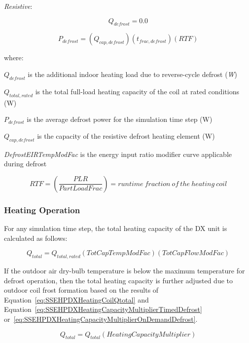 \emph{Resistive}:

\begin{equation}
{Q_{defrost}} = 0.0
\end{equation}

\begin{equation}
{P_{defrost}} = \left( {{Q_{cap,defrost}}} \right)\left( {{t_{frac,defrost}}} \right)\left( {RTF} \right)
\end{equation}

where:

\({Q_{defrost}}\) is the additional indoor heating load due to reverse-cycle defrost (\emph{W})

\({Q_{total,rated}}\) is the total full-load heating capacity of the coil at rated conditions (W)

\({P_{defrost}}\) is the average defrost power for the simulation time step (W)

\({Q_{cap,defrost}}\) is the capacity of the resistive defrost heating element (W)

\emph{DefrostEIRTempModFac} is the energy input ratio modifier curve applicable during defrost

\begin{equation}
RTF = \left( \frac{PLR}{PartLoadFrac} \right) = runtime~fraction~of~the~heating~coil
\end{equation}

\subsubsection{Heating Operation}\label{heating-operation-000}

For any simulation time step, the total heating capacity of the DX unit is calculated as follows:

\begin{equation}
Q_{total} = Q_{total,rated}\left( {TotCapTempModFac} \right)\left( {TotCapFlowModFac} \right)
\label{eq:SSEHPDXHeatingCoilQtotal}
\end{equation}

If the outdoor air dry-bulb temperature is below the maximum temperature for defrost operation, then the total heating capacity is further adjusted due to outdoor coil frost formation based on the results of Equation~\ref{eq:SSEHPDXHeatingCoilQtotal} and Equation~\ref{eq:SSEHPDXHeatingCapacityMultiplierTimedDefrost} or~\ref{eq:SSEHPDXHeatingCapacityMultiplierOnDemandDefrost}.

\begin{equation}
Q_{total} = Q_{total}\left( {HeatingCapacityMultiplier} \right)
\label{eq:SSEHPDXHeatingCoilQtotal2}
\end{equation}

